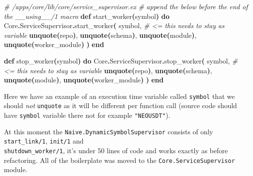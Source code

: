 \documentclass[
  oneside]{book}
\newenvironment{Shaded}{\begin{snugshade}}{\end{snugshade}}
\newcommand{\CommentTok}[1]{\textcolor[rgb]{0.56,0.35,0.01}{\textit{#1}}}
\newcommand{\ConstantTok}[1]{\textcolor[rgb]{0.56,0.35,0.01}{#1}}
\newcommand{\FunctionTok}[1]{\textcolor[rgb]{0.13,0.29,0.53}{\textbf{#1}}}
\newcommand{\KeywordTok}[1]{\textcolor[rgb]{0.13,0.29,0.53}{\textbf{#1}}}
\newcommand{\NormalTok}[1]{#1}
\newcommand{\OperatorTok}[1]{\textcolor[rgb]{0.81,0.36,0.00}{\textbf{#1}}}
\begin{document}
\begin{Shaded}
\begin{Highlighting}[]
      \CommentTok{\# /apps/core/lib/core/service\_supervisor.ex}
      \CommentTok{\# append the below before the end of the \_\_using\_\_/1 macro}
      \KeywordTok{def}\NormalTok{ start\_worker}\FunctionTok{(}\NormalTok{symbol}\FunctionTok{)} \KeywordTok{do}
        \ConstantTok{Core}\OperatorTok{.}\ConstantTok{ServiceSupervisor}\OperatorTok{.}\NormalTok{start\_worker}\FunctionTok{(}
\NormalTok{          symbol, }\CommentTok{\# \textless{}= this needs to stay as variable}
          \KeywordTok{unquote}\FunctionTok{(}\NormalTok{repo}\FunctionTok{)}\NormalTok{,}
          \KeywordTok{unquote}\FunctionTok{(}\NormalTok{schema}\FunctionTok{)}\NormalTok{,}
          \KeywordTok{unquote}\FunctionTok{(}\NormalTok{module}\FunctionTok{)}\NormalTok{, }
          \KeywordTok{unquote}\FunctionTok{(}\NormalTok{worker\_module}\FunctionTok{)}
        \FunctionTok{)}
      \KeywordTok{end}

      \KeywordTok{def}\NormalTok{ stop\_worker}\FunctionTok{(}\NormalTok{symbol}\FunctionTok{)} \KeywordTok{do}
        \ConstantTok{Core}\OperatorTok{.}\ConstantTok{ServiceSupervisor}\OperatorTok{.}\NormalTok{stop\_worker}\FunctionTok{(}
\NormalTok{          symbol, }\CommentTok{\# \textless{}= this needs to stay as variable}
          \KeywordTok{unquote}\FunctionTok{(}\NormalTok{repo}\FunctionTok{)}\NormalTok{,}
          \KeywordTok{unquote}\FunctionTok{(}\NormalTok{schema}\FunctionTok{)}\NormalTok{,}
          \KeywordTok{unquote}\FunctionTok{(}\NormalTok{module}\FunctionTok{)}\NormalTok{,}
          \KeywordTok{unquote}\FunctionTok{(}\NormalTok{worker\_module}\FunctionTok{)}
        \FunctionTok{)}
      \KeywordTok{end}
\end{Highlighting}
\end{Shaded}

Here we have an example of an execution time variable called \texttt{symbol} that we should \emph{not} \texttt{unquote} as it will be different per function call (source code should have \texttt{symbol} variable there not for example \texttt{"NEOUSDT"}).

At this moment the \texttt{Naive.DynamicSymbolSupervisor} consists of only \texttt{start\_link/1}, \texttt{init/1} and\\
\texttt{shutdown\_worker/1}, it's under 50 lines of code and works exactly as before refactoring. All of the boilerplate was moved to the \texttt{Core.ServiceSupervisor} module.
\end{document}
